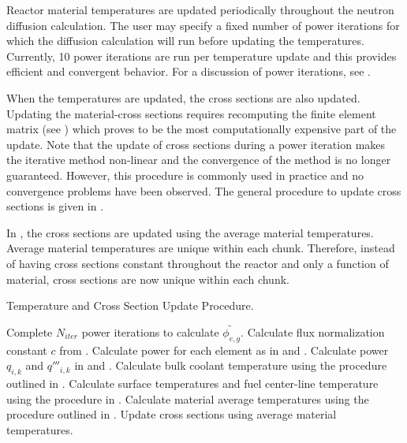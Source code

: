   Reactor material temperatures are updated periodically throughout the 
  neutron diffusion calculation. The user may specify a fixed number of power
  iterations for which the diffusion calculation will run before updating the
  temperatures. Currently, 10 power iterations are run per temperature update
  and this provides efficient and convergent behavior.
  For a discussion of power iterations, see .
  
  When
  the temperatures are updated, the cross sections are also updated. Updating
  the material-cross sections requires recomputing the finite element matrix
  (see )
  which proves to be the most computationally expensive part of the update. 
  Note that the update of cross sections during a power iteration makes the
  iterative method non-linear and the convergence of the method is no longer
  guaranteed. However, this procedure is commonly used in practice and no 
  convergence problems have been observed. The general procedure to update
  cross sections is given in .

  In , the cross sections are
  updated using the average material temperatures. Average material
  temperatures are unique within each chunk. Therefore, instead of having
  cross sections constant throughout the reactor and only a function of
  material, cross sections are now unique within each chunk.

  \begin{algorithm}
    \caption{Temperature and Cross Section Update Procedure.}
    \label{algorithm:temperature_update}
    \begin{algorithmic}[1]
      \State Complete $N_{iter}$ power iterations to calculate
        $\widetilde{\phi_{e,g}}$.
      \State Calculate flux normalization constant $c$ from
        .
      \State Calculate power for each element as in  and
        .
        \State Calculate power $q_{i,k}$ and $q'''_{i,k}$ in 
          and .
        \State Calculate bulk coolant temperature using the 
          procedure outlined in .
        \State Calculate surface temperatures and fuel center-line temperature
          using the procedure in .
        \State Calculate material average temperatures using the procedure 
          outlined in .
        \State Update cross sections using average material temperatures.
      \EndFor
    \end{algorithmic}
  \end{algorithm}


